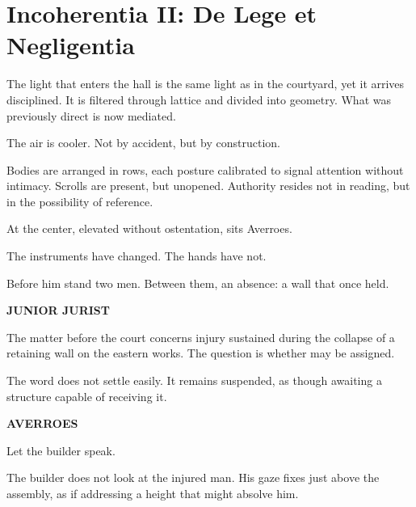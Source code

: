 
\chapter*{Incoherentia II: De Lege et Negligentia}


The light that enters the hall is the same light as in the courtyard, yet it
arrives disciplined. It is filtered through lattice and divided into geometry.
What was previously direct is now mediated.

The air is cooler. Not by accident, but by construction.

Bodies are arranged in rows, each posture calibrated to signal attention
without intimacy. Scrolls are present, but unopened. Authority resides not
in reading, but in the possibility of reference.

At the center, elevated without ostentation, sits Averroes.

The instruments have changed. The hands have not.

Before him stand two men. Between them, an absence: a wall that once held.

\medskip

\textbf{JUNIOR JURIST}

The matter before the court concerns injury sustained during the collapse of
a retaining wall on the eastern works. The question is whether 
may be assigned.

\medskip

The word does not settle easily. It remains suspended, as though awaiting a
structure capable of receiving it.

\medskip

\textbf{AVERROES}

Let the builder speak.

\medskip

The builder does not look at the injured man. His gaze fixes just above the
assembly, as if addressing a height that might absolve him.

